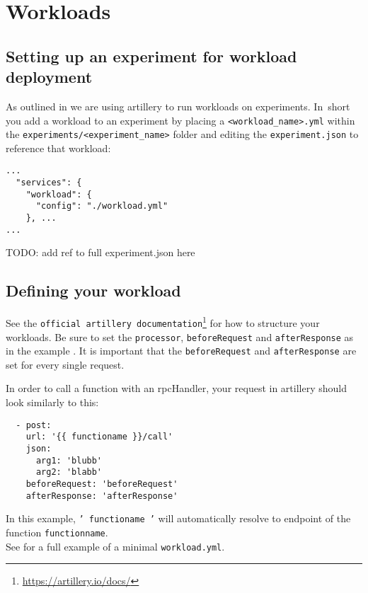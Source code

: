 \documentclass[../main.tex]{subfiles}
\begin{document}
\section{Workloads}\label{sec:WorkloadsUsage}

\subsection{Setting up an experiment for workload deployment}

As outlined in  we are using artillery to run workloads on experiments. 
In~short you add a workload to an experiment by placing a \texttt{<workload\_name>.yml} 
within the \texttt{experiments/<experiment\_name>} 
folder and editing the \texttt{experiment.json} to reference that workload:

\begin{tcolorbox}[titleDetachedStyle, title=\texttt{experiment.json}]
\begin{verbatim}
...
  "services": {
    "workload": {
      "config": "./workload.yml"
    }, ...
...
\end{verbatim}
\end{tcolorbox}

TODO: add ref to full experiment.json here

\subsection{Defining your workload}

See the \texttt{official artillery documentation}\footnote{\url{https://artillery.io/docs/}} for how to structure your workloads. 
Be sure to set the \texttt{processor}, \texttt{beforeRequest} and \texttt{afterResponse} as in the example . 
It is important that the \texttt{beforeRequest} and \texttt{afterResponse} are set for every single request.

In order to call a function with an rpcHandler, your request in artillery should look similarly to this:
\begin{tcolorbox}[titleDetachedStyle, title=\texttt{workload.yml}]
\begin{verbatim}
  - post:
    url: '{{ functioname }}/call'
    json:
      arg1: 'blubb' 
      arg2: 'blabb'
    beforeRequest: 'beforeRequest'
    afterResponse: 'afterResponse'
\end{verbatim}
\end{tcolorbox}
In this example, \texttt{'{{ functioname }}'} will automatically resolve to endpoint of the function \texttt{functionname}. \\
See  for a full example of a minimal \texttt{workload.yml}.
\end{document}
